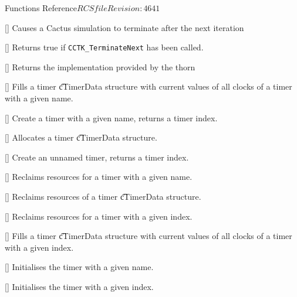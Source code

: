 \begin{cactuspart}{ Functions Reference}{$RCSfile$}{$Revision: 4641 $}
\begin{Lentry}
\item[\code{CCTK\_TerminateNext}] [\pageref{CCTK-TerminateNext}]
  Causes a Cactus simulation to terminate after the next iteration

\item[\code{CCTK\_TerminationReached}] [\pageref{CCTK-TerminationReached}]
  Returns true if {\tt CCTK\_TerminateNext} has been called.

\item[\code{CCTK\_ThornImplementation}]
  [\pageref{CCTK-ThornImplementation}]
  Returns the implementation provided by the thorn

\item[\code{CCTK\_Timer}] [\pageref{CCTK-Timer}]
  Fills a timer {\t cTimerData} structure with current values of all clocks
  of a timer with a given name.

\item[\code{CCTK\_TimerCreate}] [\pageref{CCTK-TimerCreate}]
  Create a timer with a given name, returns a timer index.

\item[\code{CCTK\_TimerCreateData}] [\pageref{CCTK-TimerCreateData}]
  Allocates a timer {\t cTimerData} structure.

\item[\code{CCTK\_TimerCreateI}] [\pageref{CCTK-TimerCreateI}]
  Create an unnamed timer, returns a timer index.

\item[\code{CCTK\_TimerDestroy}] [\pageref{CCTK-TimerDestroy}]
  Reclaims resources for a timer with a given name.

\item[\code{CCTK\_TimerDestroyData}] [\pageref{CCTK-TimerDestroyData}]
  Reclaims resources of a timer {\t cTimerData} structure.

\item[\code{CCTK\_TimerDestroyI}] [\pageref{CCTK-TimerDestroyI}]
  Reclaims resources for a timer with a given index.

\item[\code{CCTK\_TimerI}] [\pageref{CCTK-TimerI}]
  Fills a timer {\t cTimerData} structure with current values of all clocks
  of a timer with a given index.

\item[\code{CCTK\_TimerReset}] [\pageref{CCTK-TimerReset}]
  Initialises the timer with a given name.

\item[\code{CCTK\_TimerResetI}] [\pageref{CCTK-TimerResetI}]
  Initialises the timer with a given index.


\end{Lentry}
\end{cactuspart}
